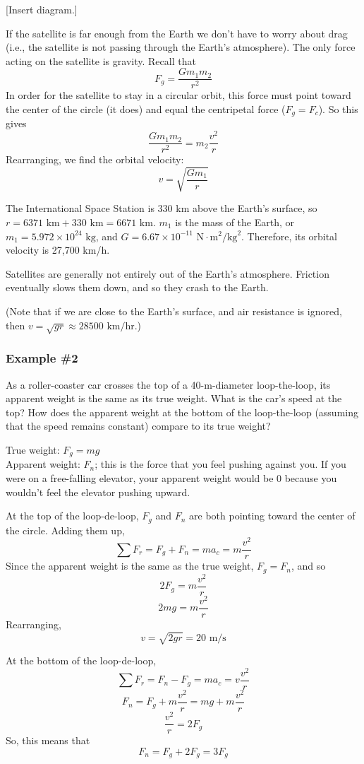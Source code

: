[Insert diagram.]
\vspace{5cm}

If the satellite is far enough from the Earth we don't have to worry about drag (i.e., the satellite is not passing through the Earth's atmosphere). The only force acting on the satellite is gravity. Recall that
$$F_g=\frac{Gm_1m_2}{r^2}$$
In order for the satellite to stay in a circular orbit, this force must point toward the center of the circle (it does) and equal the centripetal force ($F_g=F_c$). So this gives
$$\frac{Gm_1m_2}{r^2}=m_2\frac{v^2}{r}$$
Rearranging, we find the orbital velocity:
$$\boxed{v=\sqrt{\frac{Gm_1}{r}}}$$

The International Space Station is 330 km above the Earth's surface, so $r=6371\mbox{ km}+330\mbox{ km} = 6671\mbox{ km}$. $m_1$ is the mass of the Earth, or $m_1=5.972\times 10^{24}\mbox{ kg}$, and $G=6.67\times 10^{-11}\mbox{ N}\cdot\mbox{m}^2/\mbox{kg}^2$. Therefore, its orbital velocity is 27,700 km/h.

Satellites are generally not entirely out of the Earth's atmosphere. Friction eventually slows them down, and so they crash to the Earth.

(Note that if we are close to the Earth's surface, and air resistance is ignored, then $v=\sqrt{gr}\approx 28500\mbox{ km/hr}$.)

\subsubsection{Example \#2}
As a roller-coaster car crosses the top of a 40-m-diameter loop-the-loop, its apparent weight is the same as its true weight. What is the car's speed at the top? How does the apparent weight at the bottom of the loop-the-loop (assuming that the speed remains constant) compare to its true weight?

True weight: $F_g=mg$\\
Apparent weight: $F_n$; this is the force that you feel pushing against you. If you were on a free-falling elevator, your apparent weight would be 0 because you wouldn't feel the elevator pushing upward. 

At the top of the loop-de-loop, $F_g$ and $F_n$ are both pointing toward the center of the circle. Adding them up,
$$\sum F_r=F_g+F_n=ma_c=m\frac{v^2}{r}$$
Since the apparent weight is the same as the true weight, $F_g=F_n$, and so
$$2F_g=m\frac{v^2}{r}$$
$$2mg=m\frac{v^2}{r}$$
Rearranging,
$$\boxed{v=\sqrt{2gr}=20\mbox{ m/s}}$$

At the bottom of the loop-de-loop,
$$\sum F_r=F_n-F_g=ma_c=v\frac{v^2}{r}$$
$$F_n=F_g+m\frac{v^2}{r}=mg+m\frac{v^2}{r}$$
$$\frac{v^2}{r}=2F_g$$
So, this means that
$$\boxed{F_n=F_g+2F_g=3F_g}$$

